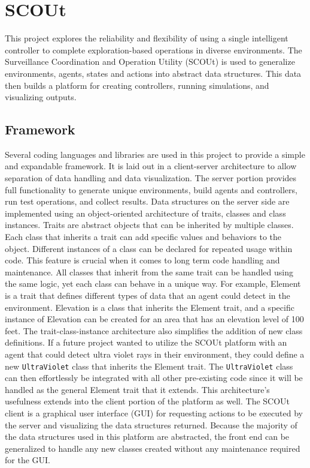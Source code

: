 

\chapter{SCOUt} \label{ch:scout}
This project explores the reliability and flexibility of using a single intelligent controller to complete exploration-based operations in diverse environments.
The Surveillance Coordination and Operation Utility (SCOUt) is used to generalize environments, agents, states and actions into abstract data structures.
This data then builds a platform for creating controllers, running simulations, and visualizing outputs.



\section{Framework} \label{sec:framework}
Several coding languages and libraries are used in this project to provide a simple and expandable framework.
It is laid out in a client-server architecture to allow separation of data handling and data visualization.
The server portion provides full functionality to generate unique environments, build agents and controllers, run test operations, and collect results.
Data structures on the server side are implemented using an object-oriented architecture of traits, classes and class instances.
Traits are abstract objects that can be inherited by multiple classes.
Each class that inherits a trait can add specific values and behaviors to the object.
Different instances of a class can be declared for repeated usage within code.
This feature is crucial when it comes to long term code handling and maintenance.
All classes that inherit from the same trait can be handled using the same logic, yet each class can behave in a unique way.
For example, Element is a trait that defines different types of data that an agent could detect in the environment.
Elevation is a class that inherits the Element trait, and a specific instance of Elevation can be created for an area that has an elevation level of 100 feet.
The trait-class-instance architecture also simplifies the addition of new class definitions.
If a future project wanted to utilize the SCOUt platform with an agent that could detect ultra violet rays in their environment, they could define a new \texttt{UltraViolet} class that inherits the Element trait.
The \texttt{UltraViolet} class can then effortlessly be integrated with all other pre-existing code since it will be handled as the general Element trait that it extends.
This architecture's usefulness extends into the client portion of the platform as well.
The SCOUt client is a graphical user interface (GUI) for requesting actions to be executed by the server and visualizing the data structures returned.
Because the majority of the data structures used in this platform are abstracted, the front end can be generalized to handle any new classes created without any maintenance required for the GUI.


